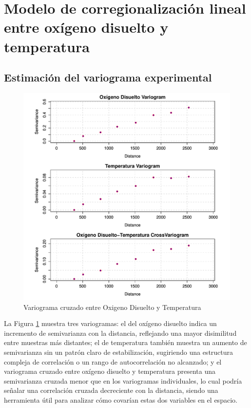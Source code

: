 \section{ Modelo de corregionalización lineal entre oxígeno disuelto y temperatura }

\subsection{Estimación del variograma experimental}
\begin{figure}[!htb]
    \centering
    \includegraphics[width=1\linewidth]{Figuras_AED/ESTIMACION/tem_od_CrossVario.pdf}
    \caption{Variograma cruzado entre Oxigeno Disuelto y Temperatura}
    \label{fig:enter-label1235}
\end{figure}


La Figura \ref{fig:enter-label1235} muestra tres variogramas: el del oxígeno disuelto indica un incremento de semivarianza con la distancia, reflejando una mayor disimilitud entre muestras más distantes; el de temperatura también muestra un aumento de semivarianza sin un patrón claro de estabilización, sugiriendo una estructura compleja de correlación o un rango de autocorrelación no alcanzado; y el variograma cruzado entre oxígeno disuelto y temperatura presenta una semivarianza cruzada menor que en los variogramas individuales, lo cual podría señalar una correlación cruzada decreciente con la distancia, siendo una herramienta útil para analizar cómo covarían estas dos variables en el espacio.



